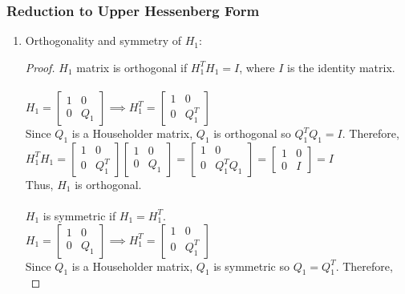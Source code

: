 \documentclass[12pt]{article}
\begin{document}
\subsubsection{Reduction to Upper Hessenberg Form}
\begin{enumerate}[label=(\alph*)]
    \item Orthogonality and symmetry of $H_1$:
        \begin{proof}
            \(H_1\) matrix is orthogonal if \( H_1^T H_1 = I \), where \( I \) is the identity matrix. \\ \\
            $ H_1 = \begin{bmatrix} 1 & 0 \\ 0 & Q_1 \end{bmatrix} \implies H_1^T = \begin{bmatrix} 1 & 0 \\ 0 & Q_1^T \end{bmatrix}$ \\
            Since $Q_1$ is a Householder matrix, $Q_1$ is orthogonal so $Q_1^TQ_1 = I$. Therefore, \\
            $H_1^T H_1 = \begin{bmatrix} 1 & 0 \\ 0 & Q_1^T \end{bmatrix} \begin{bmatrix} 1 & 0 \\ 0 & Q_1 \end{bmatrix} 
            = \begin{bmatrix} 1 & 0 \\ 0 & Q_1^TQ_1 \end{bmatrix} = \begin{bmatrix} 1 & 0 \\ 0 & I \end{bmatrix} = I$ \\
            Thus, $H_1$ is orthogonal. \\ \\
            $H_1$ is symmetric if $H_1 = H_1^T$. \\
            $H_1 = \begin{bmatrix} 1 & 0 \\ 0 & Q_1 \end{bmatrix} \implies H_1^T = \begin{bmatrix} 1 & 0 \\ 0 & Q_1^T \end{bmatrix}$ \\
            Since $Q_1$ is a Householder matrix, $Q_1$ is symmetric so $Q_1 = Q_1^T$. Therefore, \\

\end{proof}
\end{enumerate}
\end{document}
